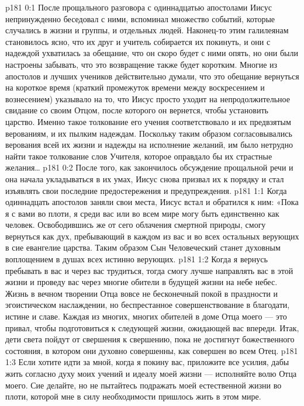 \vs p181 0:1 После прощального разговора с одиннадцатью апостолами Иисус непринужденно беседовал с ними, вспоминал множество событий, которые случались в жизни и группы, и отдельных людей. Наконец\hyp{}то этим галилеянам становилось ясно, что их друг и учитель собирается их покинуть, и они с надеждой ухватилась за обещание, что он скоро будет с ними опять, но они были настроены забывать, что это возвращение также будет коротким. Многие из апостолов и лучших учеников действительно думали, что это обещание вернуться на короткое время (краткий промежуток времени между воскресением и вознесением) указывало на то, что Иисус просто уходит на непродолжительное свидание со своим Отцом, после которого он вернется, чтобы установить царство. Именно такое толкование его учения соответствовало и их предвзятым верованиям, и их пылким надеждам. Поскольку таким образом согласовывались верования всей их жизни и надежды на исполнение желаний, им было нетрудно найти такое толкование слов Учителя, которое оправдало бы их страстные желания\ldots
\vs p181 0:2 После того, как закончилось обсуждение прощальной речи и она начала укладываться в их умах, Иисус снова призвал их к порядку и стал изъявлять свои последние предостережения и предупреждения.
\vs p181 1:1 Когда одиннадцать апостолов заняли свои места, Иисус встал и обратился к ним: «Пока я с вами во плоти, я среди вас или во всем мире могу быть единственно как человек. Освободившись же от сего облачения смертной природы, смогу вернуться как дух, пребывающий в каждом из вас и во всех остальных верующих в сие евангелие царства. Таким образом Сын Человеческий станет духовным воплощением в душах всех истинно верующих.
\vs p181 1:2 Когда я вернусь пребывать в вас и через вас трудиться, тогда смогу лучше направлять вас в этой жизни и проведу вас через многие обители в будущей жизни на небе небес. Жизнь в вечном творении Отца вовсе не бесконечный покой в праздности и эгоистическом наслаждении, но беспрестанное совершенствование в благодати, истине и славе. Каждая из многих, многих обителей в доме Отца моего --- это привал, чтобы подготовиться к следующей жизни, ожидающей вас впереди. Итак, дети света пойдут от свершения к свершению, пока не достигнут божественного состояния, в котором они духовно совершенны, как совершен во всем Отец.
\vs p181 1:3 Если хотите идти за мной, когда я покину вас, приложите все усилия, дабы жить согласно духу моих учений и идеалу моей жизни --- исполняйте волю Отца моего. Сие делайте, но не пытайтесь подражать моей естественной жизни во плоти, которой мне в силу необходимости пришлось жить в этом мире.
